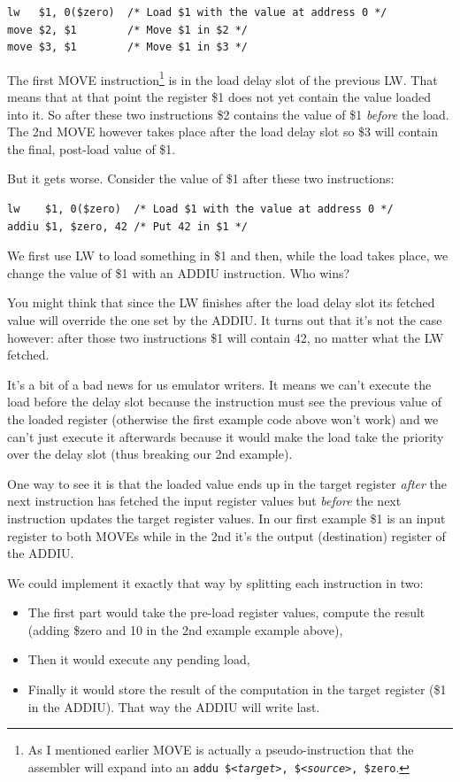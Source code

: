 \documentclass[a4paper]{article}
\newcommand{\code}[1] {\texttt{#1}}
\begin{document}
\begin{lstlisting}[language=assembly]
lw   $1, 0($zero)  /* Load $1 with the value at address 0 */
move $2, $1        /* Move $1 in $2 */
move $3, $1        /* Move $1 in $3 */
\end{lstlisting}

The first MOVE instruction\footnote{As I mentioned earlier MOVE is
  actually a pseudo-instruction that the assembler will expand into an
  \code{addu \$<\emph{target}>, \$<\emph{source}>, \$zero}.} is in
the load delay slot of the previous LW. That means that at that point
the register \$1 does not yet contain the value loaded into it. So
after these two instructions \$2 contains the value of \$1
\emph{before} the load. The 2nd MOVE however takes place after the
load delay slot so \$3 will contain the final, post-load value of \$1.

But it gets worse. Consider the value of \$1 after these two
instructions:

\begin{lstlisting}[language=assembly]
lw    $1, 0($zero)  /* Load $1 with the value at address 0 */
addiu $1, $zero, 42 /* Put 42 in $1 */
\end{lstlisting}

We first use LW to load something in \$1 and then, while the load
takes place, we change the value of \$1 with an ADDIU instruction. Who
wins?

You might think that since the LW finishes after the load delay slot
its fetched value will override the one set by the ADDIU. It turns out
that it's not the case however: after those two instructions \$1 will
contain 42, no matter what the LW fetched.

It's a bit of a bad news for us emulator writers. It means we can't
execute the load before the delay slot because the instruction must
see the previous value of the loaded register (otherwise the first
example code above won't work) and we can't just execute it afterwards
because it would make the load take the priority over the delay slot
(thus breaking our 2nd example).

One way to see it is that the loaded value ends up in the target
register \emph{after} the next instruction has fetched the input
register values but \emph{before} the next instruction updates the
target register values. In our first example \$1 is an input register
to both MOVEs while in the 2nd it's the output (destination) register
of the ADDIU.

We could implement it exactly that way by splitting each instruction
in two:
\begin{itemize}
\item The first part would take the pre-load register values, compute
  the result (adding \$zero and 10 in the 2nd example example above),
\item Then it would execute any pending load,
\item Finally it would store the result of the computation in the
  target register (\$1 in the ADDIU). That way the ADDIU will write
  last.
\end{itemize}
\end{document}
